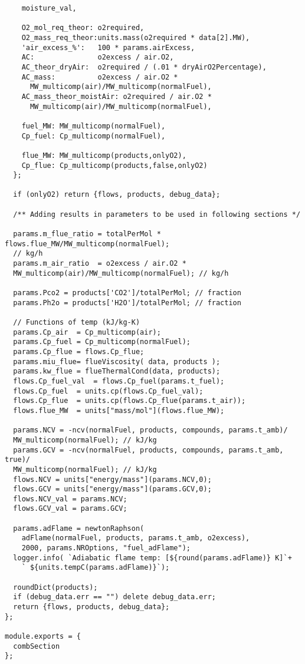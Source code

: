 \begin{verbatim}
    moisture_val,

    O2_mol_req_theor: o2required,
    O2_mass_req_theor:units.mass(o2required * data[2].MW),
    'air_excess_%':   100 * params.airExcess,
    AC:               o2excess / air.O2,
    AC_theor_dryAir:  o2required / (.01 * dryAirO2Percentage),
    AC_mass:          o2excess / air.O2 * 
      MW_multicomp(air)/MW_multicomp(normalFuel),
    AC_mass_theor_moistAir: o2required / air.O2 * 
      MW_multicomp(air)/MW_multicomp(normalFuel),

    fuel_MW: MW_multicomp(normalFuel),
    Cp_fuel: Cp_multicomp(normalFuel),

    flue_MW: MW_multicomp(products,onlyO2),
    Cp_flue: Cp_multicomp(products,false,onlyO2)
  };

  if (onlyO2) return {flows, products, debug_data};

  /** Adding results in parameters to be used in following sections */

  params.m_flue_ratio = totalPerMol * flows.flue_MW/MW_multicomp(normalFuel);  
  // kg/h
  params.m_air_ratio  = o2excess / air.O2 *
  MW_multicomp(air)/MW_multicomp(normalFuel); // kg/h

  params.Pco2 = products['CO2']/totalPerMol; // fraction
  params.Ph2o = products['H2O']/totalPerMol; // fraction

  // Functions of temp (kJ/kg-K)
  params.Cp_air  = Cp_multicomp(air);
  params.Cp_fuel = Cp_multicomp(normalFuel);
  params.Cp_flue = flows.Cp_flue;
  params.miu_flue= flueViscosity( data, products );
  params.kw_flue = flueThermalCond(data, products);
  flows.Cp_fuel_val  = flows.Cp_fuel(params.t_fuel);
  flows.Cp_fuel  = units.cp(flows.Cp_fuel_val);
  flows.Cp_flue  = units.cp(flows.Cp_flue(params.t_air));
  flows.flue_MW  = units["mass/mol"](flows.flue_MW);

  params.NCV = -ncv(normalFuel, products, compounds, params.t_amb)/
  MW_multicomp(normalFuel); // kJ/kg
  params.GCV = -ncv(normalFuel, products, compounds, params.t_amb, true)/
  MW_multicomp(normalFuel); // kJ/kg
  flows.NCV = units["energy/mass"](params.NCV,0);
  flows.GCV = units["energy/mass"](params.GCV,0);
  flows.NCV_val = params.NCV;
  flows.GCV_val = params.GCV;

  params.adFlame = newtonRaphson(
    adFlame(normalFuel, products, params.t_amb, o2excess),
    2000, params.NROptions, "fuel_adFlame");
  logger.info( `Adiabatic flame temp: [${round(params.adFlame)} K]`+
    ` ${units.tempC(params.adFlame)}`);

  roundDict(products);
  if (debug_data.err == "") delete debug_data.err;
  return {flows, products, debug_data};
};

module.exports = {
  combSection
};
\end{verbatim}

